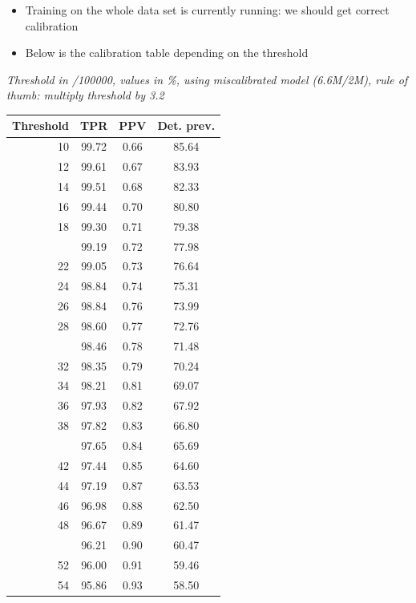 \documentclass[12pt]{article}
\begin{document}
\begin{itemize}
	\item Training on the whole data set is currently running: we should get correct calibration
	\item Below is the calibration table depending on the threshold
\end{itemize}

\pagebreak


\textit{Threshold in /100000, values in \%, using miscalibrated model (6.6M/2M), rule of thumb: multiply threshold by 3.2}\\
\begin{minipage}{0.5\textwidth}\small
\begin{tabular}{rccc}
\toprule
\textbf{Threshold} & \textbf{TPR} 
& \textbf{PPV} & \textbf{Det. prev.} \\
\midrule
   10 & 99.72 & 0.66 & 85.64 \\ 
     12 & 99.61 & 0.67 & 83.93 \\ 
     14 & 99.51 & 0.68 & 82.33 \\ 
     16 & 99.44 & 0.70 & 80.80 \\ 
     18 & 99.30 & 0.71 & 79.38 \\ \addlinespace
     20 & 99.19 & 0.72 & 77.98 \\ 
     22 & 99.05 & 0.73 & 76.64 \\ 
     24 & 98.84 & 0.74 & 75.31 \\ 
     26 & 98.84 & 0.76 & 73.99 \\ 
     28 & 98.60 & 0.77 & 72.76 \\ \addlinespace
     30 & 98.46 & 0.78 & 71.48 \\ 
     32 & 98.35 & 0.79 & 70.24 \\ 
     34 & 98.21 & 0.81 & 69.07 \\ 
     36 & 97.93 & 0.82 & 67.92 \\ 
     38 & 97.82 & 0.83 & 66.80 \\ \addlinespace
     40 & 97.65 & 0.84 & 65.69 \\ 
     42 & 97.44 & 0.85 & 64.60 \\ 
     44 & 97.19 & 0.87 & 63.53 \\ 
     46 & 96.98 & 0.88 & 62.50 \\ 
     48 & 96.67 & 0.89 & 61.47 \\ \addlinespace
     50 & 96.21 & 0.90 & 60.47 \\ 
     52 & 96.00 & 0.91 & 59.46 \\ 
     54 & 95.86 & 0.93 & 58.50 \\ 

\end{tabular}
\end{minipage}
\end{document}
